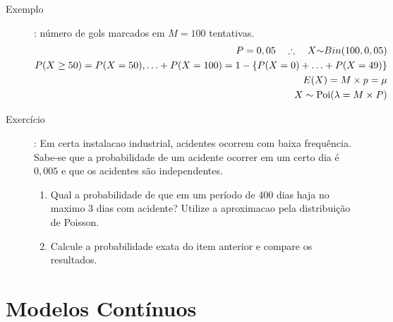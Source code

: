 \begin{description}
      \item [Exemplo]: número de gols marcados em $M=100$ tentativas.
    \begin{align*}
      P=0,05 \quad \therefore \quad  X \mathtt{\sim} Bin(100, 0,05) \\
      P(X \ge 50)=P(X=50), \ldots + P(X=100)= 1- \{P(X=0)+\ldots+P(X=49) \}\\
      E(X)=M \times p = \mu\\
      X \sim \operatorname{Poi}(\lambda= M \times P)
    \end{align*}
  \item[Exercício]: Em certa instalacao industrial, acidentes ocorrem com baixa frequência. Sabe-se que 
    a probabilidade de um acidente ocorrer em um certo dia é $0,005$ e que os acidentes são independentes.
    \begin{enumerate}[label=(\alph*)]
      \item Qual a probabilidade de que em um período de 400 dias haja no maximo 3 dias com acidente?
      Utilize a aproximacao pela distribuição de Poisson.
    \item Calcule a probabilidade exata do item anterior e compare os resultados.
   \end{enumerate}
   \end{description}
   \section{Modelos Contínuos}
